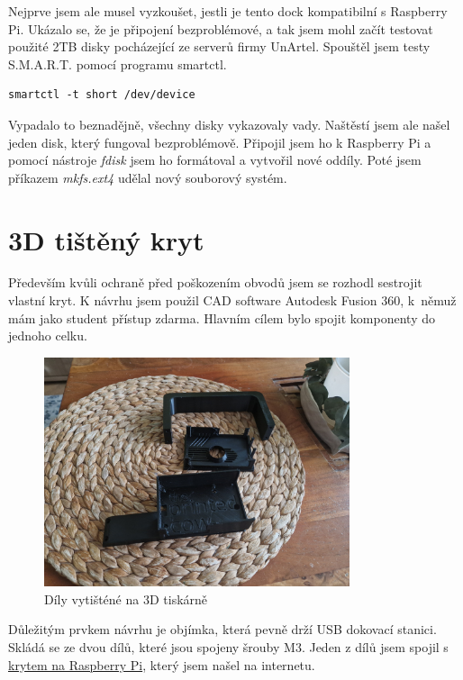 \documentclass[a4paper,12pt, oneside]{book}
\begin{document}
Nejprve jsem ale musel vyzkoušet, jestli je tento dock kompatibilní 
s Raspberry Pi. Ukázalo se, že je připojení bezproblémové, a tak
jsem mohl začít testovat použité 2TB disky pocházející ze serverů
firmy UnArtel. Spouštěl jsem testy S.M.A.R.T. pomocí programu smartctl.

\begin{lstlisting}
smartctl -t short /dev/device
\end{lstlisting} 

Vypadalo to beznadějně, všechny disky vykazovaly vady. 
Naštěstí jsem ale našel jeden disk, který fungoval bezproblémově.
Připojil jsem ho k Raspberry Pi a pomocí nástroje
\emph{fdisk} jsem ho formátoval a vytvořil nové oddíly.
Poté jsem příkazem \emph{mkfs.ext4} udělal nový souborový systém.


\newpage


\section{3D tištěný kryt}

Především kvůli ochraně před poškozením obvodů jsem se rozhodl 
sestrojit vlastní kryt. K návrhu jsem použil CAD software 
Autodesk Fusion 360, k němuž mám jako student přístup zdarma.
Hlavním cílem bylo spojit komponenty do jednoho celku.


\begin{figure}[h]
\centering
\includegraphics[width=0.8\textwidth]{img/dily-zvlast.jpg}
\caption{Díly vytišténé na 3D tiskárně}
\end{figure}

Důležitým prvkem návrhu je objímka, která pevně drží USB dokovací stanici.
Skládá se ze dvou dílů, které jsou spojeny šrouby M3. Jeden z dílů jsem
spojil s
\href{https://www.printables.com/model/705427-retro-raspberry-pi-5-case-snap-fit}{krytem
na Raspberry Pi}, který jsem našel na internetu.
\end{document}
